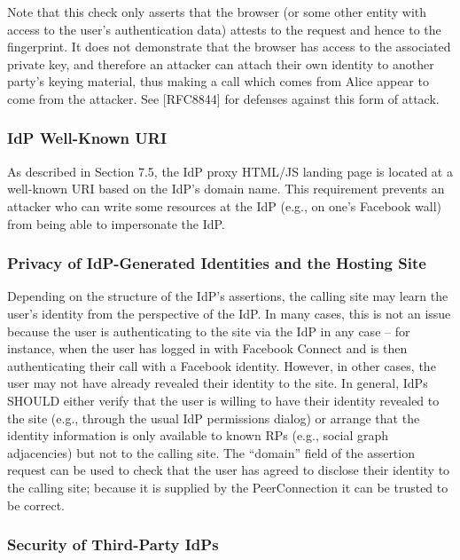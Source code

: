 \documentclass{article}
\begin{document}
Note that this check only asserts that the browser (or some other
entity with access to the user's authentication data) attests to the
request and hence to the fingerprint.  It does not demonstrate that
the browser has access to the associated private key, and therefore
an attacker can attach their own identity to another party's keying
material, thus making a call which comes from Alice appear to come
from the attacker.  See [RFC8844] for defenses against this form of
attack.

\subsubsection{IdP Well-Known URI}

As described in Section 7.5, the IdP proxy HTML/JS landing page is
located at a well-known URI based on the IdP's domain name.  This
requirement prevents an attacker who can write some resources at the
IdP (e.g., on one's Facebook wall) from being able to impersonate the
IdP.

\subsubsection{Privacy of IdP-Generated Identities and the Hosting Site}

Depending on the structure of the IdP's assertions, the calling site
may learn the user's identity from the perspective of the IdP.  In
many cases, this is not an issue because the user is authenticating
to the site via the IdP in any case -- for instance, when the user
has logged in with Facebook Connect and is then authenticating their
call with a Facebook identity.  However, in other cases, the user may
not have already revealed their identity to the site.  In general,
IdPs SHOULD either verify that the user is willing to have their
identity revealed to the site (e.g., through the usual IdP
permissions dialog) or arrange that the identity information is only
available to known RPs (e.g., social graph adjacencies) but not to
the calling site.  The ``domain'' field of the assertion request can be
used to check that the user has agreed to disclose their identity to
the calling site; because it is supplied by the PeerConnection it can
be trusted to be correct.

\subsubsection{Security of Third-Party IdPs}
\end{document}
